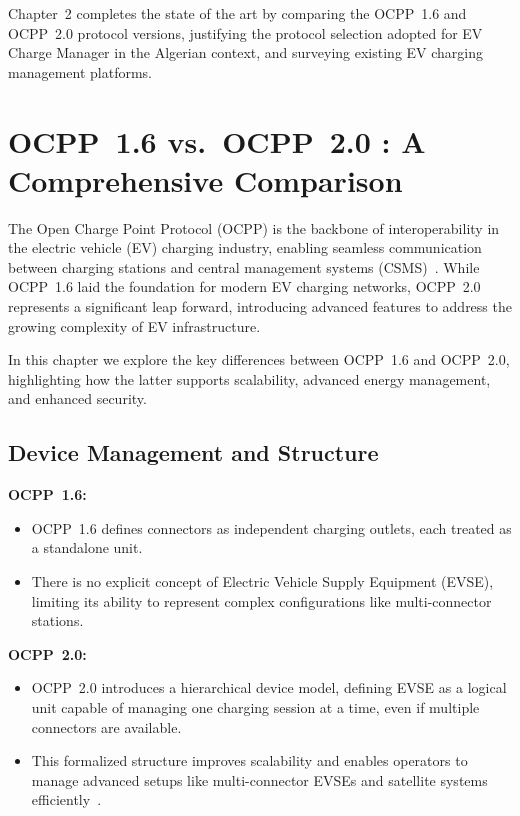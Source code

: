 \documentclass[12pt,a4paper]{report}
\begin{document}
Chapter~2 completes the state of the art by comparing the OCPP~1.6 and OCPP~2.0 protocol
versions, justifying the protocol selection adopted for EV Charge Manager in the Algerian
context, and surveying existing EV charging management platforms.


\chapter{OCPP~1.6 vs.\ OCPP~2.0 : A Comprehensive Comparison}

The Open Charge Point Protocol (OCPP) is the backbone of interoperability in the electric vehicle
(EV) charging industry, enabling seamless communication between charging stations and central
management systems (CSMS)~\autocite{ocpp16_ed2, ocpp201}. While OCPP~1.6 laid the foundation for
modern EV charging networks, OCPP~2.0 represents a significant leap forward, introducing advanced
features to address the growing complexity of EV infrastructure.

In this chapter we explore the key differences between OCPP~1.6 and OCPP~2.0, highlighting how
the latter supports scalability, advanced energy management, and enhanced security.

\section{Device Management and Structure}

\textbf{OCPP~1.6:}
\begin{itemize}
  \item OCPP~1.6 defines connectors as independent charging outlets, each treated as a standalone
        unit.
  \item There is no explicit concept of Electric Vehicle Supply Equipment (EVSE), limiting its
        ability to represent complex configurations like multi-connector stations.
\end{itemize}
\noindent
\textbf{OCPP~2.0:}
\begin{itemize}
  \item OCPP~2.0 introduces a hierarchical device model, defining EVSE as a logical unit capable
        of managing one charging session at a time, even if multiple connectors are available.
  \item This formalized structure improves scalability and enables operators to manage advanced
        setups like multi-connector EVSEs and satellite systems efficiently~\autocite{ocpp201}.
\end{itemize}
\end{document}
